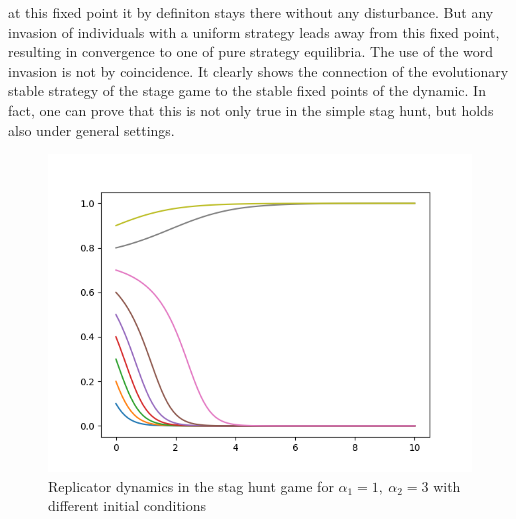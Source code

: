 \documentclass[11pt]{article}
\begin{document}
 at this fixed point it by definiton stays there without any disturbance. 
 But any invasion of individuals with a uniform strategy leads away from
 this fixed point, resulting in convergence to one of pure strategy equilibria.
 The use of the word invasion is not by coincidence. It clearly shows the 
 connection of the evolutionary stable strategy of the stage game to the 
 stable fixed points of the dynamic. In fact, one can prove that this is not
 only true in the simple stag hunt, but holds also under general settings.
\begin{figure}
        \centering
        \includegraphics[scale=0.5]{basinofattraction.png}
        \caption{Replicator dynamics in the stag hunt game for 
                $\alpha_1=1,\ \alpha_2=3$ with different initial conditions}
                \label{fig:basinofattraction}
\end{figure}
\end{document}
